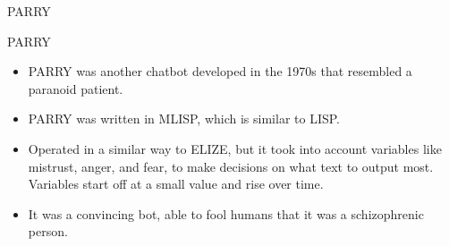 \documentclass[10pt]{beamer}
\begin{document}
\begin{frame}{PARRY}
\end{frame}

\begin{frame}{PARRY}
\begin{itemize}
\item PARRY was another chatbot developed in the 1970s that resembled a paranoid patient.\cite{COLBY19711}
\item PARRY was written in MLISP, which is similar to LISP.
\item Operated in a similar way to ELIZE, but it took into account variables like mistrust, anger, and fear, to make decisions on what text to output most.  Variables start off at a small value and rise over time.
\item It was a convincing bot, able to fool humans that it was a schizophrenic person.
\end{itemize}
\end{frame}
\end{document}
